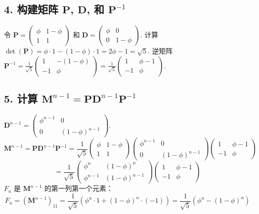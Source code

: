 \documentclass{article}
\begin{document}
\subsection*{4. 构建矩阵 $\mathbf{P}$, $\mathbf{D}$, 和 $\mathbf{P}^{-1}$}

令 $\mathbf{P} = \begin{pmatrix} \phi & 1-\phi \\ 1 & 1 \end{pmatrix}$ 和 $\mathbf{D} = \begin{pmatrix} \phi & 0 \\ 0 & 1-\phi \end{pmatrix}$.
计算 $\det(\mathbf{P}) = \phi \cdot 1 - (1-\phi) \cdot 1 = 2\phi - 1 = \sqrt{5}$.
逆矩阵 $\mathbf{P}^{-1} = \frac{1}{\sqrt{5}} \begin{pmatrix} 1 & - (1-\phi) \\ -1 & \phi \end{pmatrix} = \frac{1}{\sqrt{5}} \begin{pmatrix} 1 & \phi-1 \\ -1 & \phi \end{pmatrix}$.

\subsection*{5. 计算 $\mathbf{M}^{n-1} = \mathbf{P} \mathbf{D}^{n-1} \mathbf{P}^{-1}$}

$\mathbf{D}^{n-1} = \begin{pmatrix} \phi^{n-1} & 0 \\ 0 & (1-\phi)^{n-1} \end{pmatrix}$.
$$ \mathbf{M}^{n-1} = \mathbf{P} \mathbf{D}^{n-1} \mathbf{P}^{-1} = \frac{1}{\sqrt{5}} \begin{pmatrix} \phi & 1-\phi \\ 1 & 1 \end{pmatrix} \begin{pmatrix} \phi^{n-1} & 0 \\ 0 & (1-\phi)^{n-1} \end{pmatrix} \begin{pmatrix} 1 & \phi-1 \\ -1 & \phi \end{pmatrix} $$
$$ = \frac{1}{\sqrt{5}} \begin{pmatrix} \phi^n & (1-\phi)^n \\ \phi^{n-1} & (1-\phi)^{n-1} \end{pmatrix} \begin{pmatrix} 1 & \phi-1 \\ -1 & \phi \end{pmatrix} $$
$F_n$ 是 $\mathbf{M}^{n-1}$ 的第一列第一个元素：
$$ F_n = (\mathbf{M}^{n-1})_{11} = \frac{1}{\sqrt{5}} \left( \phi^n \cdot 1 + (1-\phi)^n \cdot (-1) \right) = \frac{1}{\sqrt{5}} \left( \phi^n - (1-\phi)^n \right) $$
\end{document}
